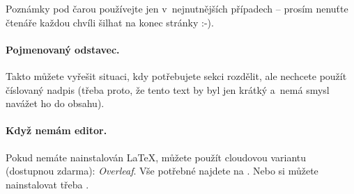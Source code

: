 Poznámky pod čarou používejte jen v~nejnutnějších případech -- prosím nenuťte čtenáře každou chvíli šilhat na konec stránky :-).

\paragraph{Pojmenovaný odstavec.} Takto můžete vyřešit situaci, kdy potřebujete sekci rozdělit, ale nechcete použít číslovaný nadpis (třeba proto, že tento text by byl jen krátký a~nemá smysl navážet ho do obsahu).

\paragraph{Když nemám editor.} Pokud nemáte nainstalován \LaTeX, můžete použít cloudovou variantu (dostupnou zdarma): \emph{Overleaf}. Vše potřebné najdete na \cite{overleaf}. Nebo si můžete nainstalovat třeba \MikTeX\cite{miktex}.




